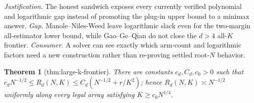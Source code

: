 \documentclass{article}
\newtheorem{theorem}{Theorem}
\begin{document}
\par\smallskip\noindent \textit{Justification.} The honest sandwich exposes every currently verified polynomial and logarithmic gap instead of promoting the plug-in upper bound to a minimax answer. \textit{Gap.} Manole--Niles-Weed leave logarithmic slack even for the two-margin all-estimator lower bound, while Gao--Ge--Qian do not close the \(d>4\) all-\(K\) frontier. \textit{Consumer.} A solver can see exactly which arm-count and logarithmic factors need a new construction rather than re-proving settled root-\(N\) behavior.

\begin{theorem}[thm:large-k-frontier]\label{thm:large-k-frontier}
There are constants \(c_d,C_d,c_0>0\) such that \(c_dN^{-1/2}\le R_d(N,K)\le C_d(N^{-1/2}+r/K^2)\); hence \(R_d(N,K)\asymp N^{-1/2}\) uniformly along every legal array satisfying \(K\ge c_0N^{1/4}\).
\end{theorem}
\end{document}
